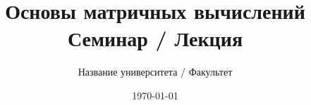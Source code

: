 
\newcommand{\R}{\mathbb{R}}
\renewcommand{\C}{\mathbb{C}}
\newcommand{\N}{\mathbb{N}}
\newcommand{\Z}{\mathbb{Z}}

\DeclareMathOperator{\rank}{rank}
\DeclareMathOperator{\tr}{tr}
\DeclareMathOperator{\diag}{diag}
\DeclareMathOperator{\im}{Im}
\undef\ker
\DeclareMathOperator{\ker}{Ker}
\DeclareMathOperator{\Span}{span}
\DeclareMathOperator{\cond}{cond}
\DeclareMathOperator{\sign}{sign}

\newcommand{\T}{^{\mathsf{T}}}
\newcommand{\Htrans}{^{\mathsf{H}}}
\let\H\Htrans

\DeclarePairedDelimiter{\abs}{\lvert}{\rvert}
\DeclarePairedDelimiter{\norm}{\lVert}{\rVert}
\DeclarePairedDelimiter{\inner}{\langle}{\rangle}
\DeclarePairedDelimiter{\ceil}{\lceil}{\rceil}
\DeclarePairedDelimiter{\floor}{\lfloor}{\rfloor}

\makeatletter
\let\oldabs\abs
\def\abs{\@ifstar{\oldabs}{\oldabs*}}
\let\oldnorm\norm
\def\norm{\@ifstar{\oldnorm}{\oldnorm*}}
\makeatother

\usepackage{import}


\title{\textbf{Основы матричных вычислений}\\ \Large Семинар / Лекция}
\author{Название университета / Факультет}
\date{\today}


